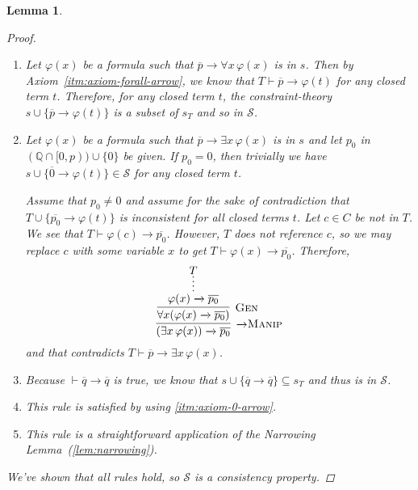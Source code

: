 \documentclass{amsart}
\newtheorem{lemma}[theorem]{Lemma}
\theoremstyle{definition}
\numberwithin{equation}{theorem}
\renewcommand{\phi}{\varphi}
\newcommand{\Q}{\mathbb{Q}}
\newcommand{\unvee}{{\vee}}
\newcommand{\unwedge}{{\wedge}}
\newcommand{\proves}{\vdash}
\newcommand{\rat}[1]{{\overline{#1}}}
\newcommand{\narrow}[1]{\xrightarrow{#1}}
\renewcommand{\to}{\narrow{}}
\newcommand{\arr}{{\to}}
\newcommand{\intro}{\!\operatorname{I}}
\newcommand{\pushdown}{\arr\text{\sc{Manip}}}
\newcommand{\generalization}{\text{\sc{Gen}}}
\begin{document}
\begin{lemma}
\begin{proof}
\begin{enumerate}[label=(CP\arabic*)]
	    \[
	      \infer[\pushdown]{(\unvee\Phi)\to\rat{p_0}}{
	        \infer[\unwedge\intro]{\bigwedge_{\phi\in\Phi}(\phi\to\rat{p_0})}{
	          \infer*{\phi\to\rat{p_0}\text{ (for all $\phi\in\Phi$)}}{T}
	        }
	      }
	    \]
	    However, by assumption we know that $T\proves p\to(\unvee\Phi)$ and $p_0<p$, so $T$ must be inconsistent.
	    That's a contradiction, so we know that we can pick some $\phi\in\Phi$ such that $T\cup\{\rat{p_0}\to\phi\}$ is consistent. Notice that
	    \[
	      s\cup\{\rat{p_0}\to\phi\}\subseteq s_{T\cup\{\rat{p_0}\to\phi\}},
	    \]
	    and so $s\cup\{\rat{p_0}\to\phi\}\in \mathscr{S}$.
	  \item
	    Let $\phi(x)$ be a formula such that $\rat{p}\to\forall x\,\phi(x)$ is in $s$.
	    Then by Axiom~\ref{itm:axiom-forall-arrow}, we know that $T\proves\rat{p}\to\phi(t)$ for any closed term $t$.
	    Therefore, for any closed term $t$, the constraint-theory $s\cup\{\rat{p}\to\phi(t)\}$ is a subset of $s_T$ and so in $\mathscr{S}$.
	  \item
	    Let $\phi(x)$ be a formula such that $\rat p\to\exists x\,\phi(x)$ is in $s$ and let $p_0$ in $(\Q\cap[0,p))\cup\{0\}$ be given.
	    If $p_0=0$, then trivially we have $s\cup\{\rat 0\to\phi(t)\}\in \mathscr{S}$ for any closed term $t$.
	    
	    Assume that $p_0\neq 0$ and assume for the sake of contradiction that $T\cup\{\rat{p_0}\to\phi(t)\}$ is inconsistent for all closed terms $t$.
	    Let $c\in C$ be not in $T$.
	    We see that $T\proves\phi(c)\to\rat{p_0}$.
	    However, $T$ does not reference $c$, so we may replace $c$ with some variable $x$ to get $T\proves\phi(x)\to\rat{p_0}$.
	    Therefore,
	    \[
	      \infer[\pushdown]{(\exists x\,\phi(x))\to\rat{p_0}}{
	        \infer[\generalization]{\forall x(\phi(x)\to\rat{p_0})}{
	          \infer*{\phi(x)\to\rat{p_0}}{T}
	        }
	      }
	    \]
	    and that contradicts $T\proves\rat p\to\exists x\,\phi(x)$.
    \item
      Because $\proves\rat q\to\rat q$ is true, we know that $s\cup\{\rat q\to\rat q\}\subseteq s_T$ and thus is in $\mathscr{S}$.
    \item This rule is satisfied by using \ref{itm:axiom-0-arrow}.
	  \item This rule is a straightforward application of the Narrowing Lemma~(\ref{lem:narrowing}).
    \end{enumerate}
    We've shown that all rules hold, so $\mathscr{S}$ is a consistency property.
  \end{proof}
\end{lemma}
\end{document}
